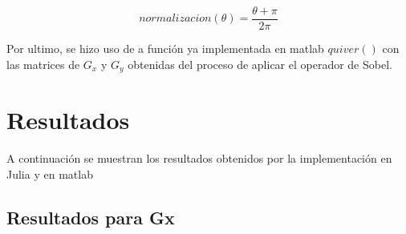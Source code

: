 \documentclass[11pt, letterpaper]{article}
\begin{document}
	$$normalizacion(\theta) = \frac{\theta + \pi}{2 \pi}$$
	
	Por ultimo, se hizo uso de a función ya implementada en matlab $quiver()$ con las matrices de $G_x$ y $G_y$	obtenidas del proceso de aplicar el operador de Sobel.
	
\newpage
	
\section{Resultados}

A continuación se muestran los resultados obtenidos por la implementación en Julia y en matlab

\subsection{Resultados para Gx}
\end{document}
